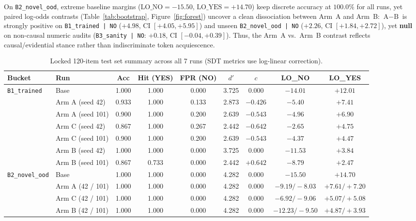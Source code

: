 \documentclass[11pt,a4paper]{article}
\begin{document}
On \texttt{B2\_novel\_ood}, extreme baseline margins ($\text{LO\_NO}=-15.50$, $\text{LO\_YES}=+14.70$) keep discrete accuracy at $100.0\%$ for all runs, yet paired log-odds contrasts (Table~\ref{tab:bootstrap}, Figure~\ref{fig:forest}) uncover a clean dissociation between Arm~A and Arm~B: $\text{A}-\text{B}$ is strongly positive on \texttt{B1\_trained | NO} ($+4.98$, CI $[+4.05, +5.95]$) and unseen \texttt{B2\_novel\_ood | NO} ($+2.26$, CI $[+1.84, +2.72]$), yet \textbf{null} on non-causal numeric audits (\texttt{B3\_sanity | NO}: $+0.18$, CI $[-0.04, +0.39]$). Thus, the Arm~A vs.\ Arm~B contrast reflects causal/evidential stance rather than indiscriminate token acquiescence.

\begin{table}[t]
\centering
\caption{Locked 120-item test set summary across all 7 runs (SDT metrics use log-linear correction).}
\label{tab:locked120}
\small
\begin{tabular}{llccccccc}
\toprule
\textbf{Bucket} & \textbf{Run} & \textbf{Acc} & \textbf{Hit (YES)} & \textbf{FPR (NO)} & $d'$ & $c$ & \textbf{LO\_NO} & \textbf{LO\_YES} \\
\midrule
\multirow{7}{*}{\texttt{B1\_trained}}
 & Base            & 1.000 & 1.000 & 0.000 & 3.725 &  0.000 & $-14.01$ & $+12.01$ \\
 & Arm A (seed 42) & 0.933 & 1.000 & 0.133 & 2.873 & $-0.426$ & $-5.40$ & $+7.41$ \\
 & Arm A (seed 101)& 0.900 & 1.000 & 0.200 & 2.639 & $-0.543$ & $-4.96$ & $+6.90$ \\
 & Arm C (seed 42) & 0.867 & 1.000 & 0.267 & 2.442 & $-0.642$ & $-2.65$ & $+4.75$ \\
 & Arm C (seed 101)& 0.900 & 1.000 & 0.200 & 2.639 & $-0.543$ & $-4.37$ & $+4.47$ \\
 & Arm B (seed 42) & 1.000 & 1.000 & 0.000 & 3.725 &  0.000 & $-11.53$ & $+3.84$ \\
 & Arm B (seed 101)& 0.867 & 0.733 & 0.000 & 2.442 & $+0.642$ & $-8.79$ & $+2.47$ \\
\midrule
\multirow{4}{*}{\texttt{B2\_novel\_ood}}
 & Base            & 1.000 & 1.000 & 0.000 & 4.282 & 0.000 & $-15.50$ & $+14.70$ \\
 & Arm A (42 / 101)& 1.000 & 1.000 & 0.000 & 4.282 & 0.000 & $-9.19 / -8.03$ & $+7.61 / +7.20$ \\
 & Arm C (42 / 101)& 1.000 & 1.000 & 0.000 & 4.282 & 0.000 & $-6.92 / -9.06$ & $+5.07 / +5.08$ \\
 & Arm B (42 / 101)& 1.000 & 1.000 & 0.000 & 4.282 & 0.000 & $-12.23 / -9.50$ & $+4.87 / +3.93$ \\

\end{tabular}
\end{table}
\end{document}
